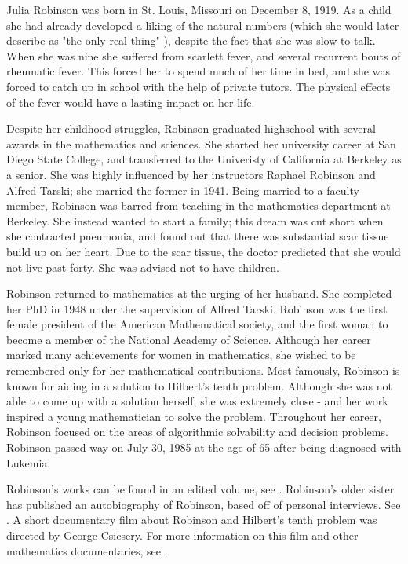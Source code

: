 \documentclass[../../../include/open-logic-section]{subfiles}
\begin{document}



Julia Robinson was born in St. Louis, Missouri on December 8, 1919. As a
child she had already developed a liking of the natural numbers (which she
would later describe as "the only real thing" \citep[xix]{Feferman1996}),
despite the fact that she was slow to talk. When she was nine she suffered
from scarlett fever, and several recurrent bouts of rheumatic fever. This
forced her to spend much of her time in bed, and she was forced to catch up
in school with the help of private tutors. The physical effects of the
fever would have a lasting impact on her life.

Despite her childhood struggles, Robinson graduated highschool with several
awards in the mathematics and sciences. She started her university career
at San Diego State College, and transferred to the Univeristy of California
at Berkeley as a senior. She was highly influenced by her instructors
Raphael Robinson and Alfred Tarski; she married the former in 1941. Being
married to a faculty member, Robinson was barred from teaching in the 
mathematics department at Berkeley. She instead wanted to start a family;
this dream was cut short when she contracted pneumonia, and found out
that there was substantial scar tissue build up on her heart. Due to the scar
tissue, the doctor predicted that she would not live past forty. She was advised
not to have children.

Robinson returned to mathematics at the urging of her husband. She completed
her PhD in 1948 under the supervision of Alfred Tarski. Robinson was the first 
female president of the American Mathematical society, and the first woman 
to become a member of the National Academy of Science. 
Although her career marked many achievements for women in
mathematics, she wished to be remembered only for her mathematical
contributions. Most famously, Robinson is known for aiding in a solution to
Hilbert's tenth problem. Although she was not able to come up with a solution
herself, she was extremely close - and her work inspired a young mathematician
to solve the problem. Throughout her career, Robinson focused on the areas of
algorithmic solvability and decision problems. Robinson passed way on July
30, 1985 at the age of 65 after being diagnosed with Lukemia.


\begin{reading} 
Robinson's works can be found in an edited volume, see
\citet{Robinson1996}. Robinson's older sister has published an
autobiography of Robinson, based off of personal interviews. See
\citet{Reid1986}. A short documentary film about Robinson and 
Hilbert's tenth problem was directed by George Csicsery. For more
information on this film and other mathematics documentaries, see
\citet{Csicsery2016}.
\end{reading}
\end{document}

